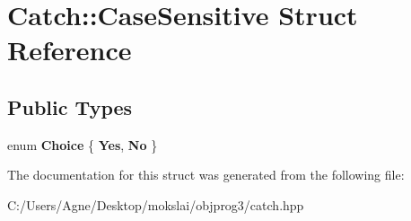 \hypertarget{struct_catch_1_1_case_sensitive}{}\section{Catch\+:\+:Case\+Sensitive Struct Reference}
\label{struct_catch_1_1_case_sensitive}
\subsection*{Public Types}
\begin{DoxyCompactItemize}
\item 
\mbox{\label{struct_catch_1_1_case_sensitive_aad49d3aee2d97066642fffa919685c6a}} 
enum {\bfseries Choice} \{ {\bfseries Yes}, 
{\bfseries No}
 \}
\end{DoxyCompactItemize}


The documentation for this struct was generated from the following file\+:\begin{DoxyCompactItemize}
\item 
C\+:/\+Users/\+Agne/\+Desktop/mokslai/objprog3/catch.\+hpp\end{DoxyCompactItemize}
